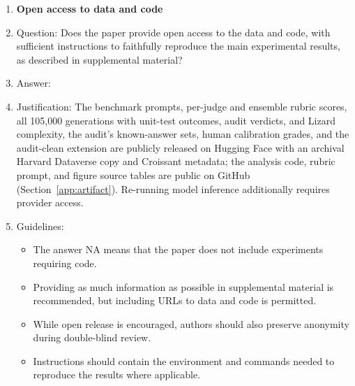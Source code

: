 \begin{enumerate}
\item {\bf Open access to data and code}
    \item[] Question: Does the paper provide open access to the data and code, with sufficient instructions to faithfully reproduce the main experimental results, as described in supplemental material?
    \item[] Answer: \answerYes{}
    \item[] Justification: The benchmark prompts, per-judge and ensemble rubric scores, all 105{,}000 generations with unit-test outcomes, audit verdicts, and Lizard complexity, the audit's known-answer sets, human calibration grades, and the audit-clean extension are publicly released on Hugging Face with an archival Harvard Dataverse copy and Croissant metadata; the analysis code, rubric prompt, and figure source tables are public on GitHub (Section~\ref{app:artifact}). Re-running model inference additionally requires provider access.
    \item[] Guidelines:
    \begin{itemize}
        \item The answer NA means that the paper does not include experiments requiring code.
        \item Providing as much information as possible in supplemental material is recommended, but including URLs to data and code is permitted.
        \item While open release is encouraged, authors should also preserve anonymity during double-blind review.
        \item Instructions should contain the environment and commands needed to reproduce the results where applicable.
    \end{itemize}


\end{enumerate}

